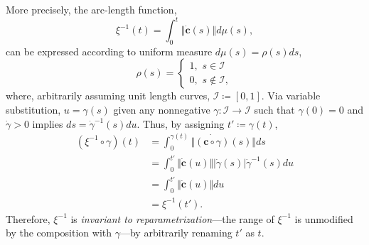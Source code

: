 \documentclass[pdflatex,iicol]{sn-jnl}%
\theoremstyle{thmstyleone}%
\theoremstyle{thmstyletwo}%
\theoremstyle{thmstylethree}%
\begin{document}
More precisely, the arc-length function,
\begin{equation}
    \xi^{-1}(t) = \int_{0}^t \Vert \dot{\boldsymbol{c}}(s) \Vert d\mu(s),
\end{equation}
can be expressed according to uniform measure $d\mu(s) = \rho(s)ds$, 
\begin{equation}
    \rho(s) = \begin{cases}
                    1, \,\, s \in \mathcal{I}\\
                    0, \,\, s \notin \mathcal{I},
              \end{cases}
\end{equation} 
where, arbitrarily assuming unit length curves, $\mathcal{I} \coloneqq [0,1]$. Via variable substitution, $u = \gamma(s)$ given any nonnegative $\gamma:\mathcal{I} \rightarrow\mathcal{I}$ such that $\gamma(0) = 0$ and $\dot{\gamma} > 0$ implies $ds = \dot{\gamma}^{-1}(s)du$. Thus, by assigning $t' \coloneqq \gamma(t)$,
\begin{align}
    (\xi^{-1}\circ \gamma)(t) &= \int_0^{\gamma(t)}\Vert \dot{(\boldsymbol{c}\circ \gamma)}(s)\Vert ds \\ \nonumber
    &= \int_0^{t'} \Vert \dot{\boldsymbol{c}}(u) \Vert \vert \dot{\gamma}(s) \vert \dot{\gamma}^{-1}(s)du \\ \nonumber
    &= \int_0^{t'}\Vert \dot{\boldsymbol{c}}(u) \Vert du\\ \nonumber
    &= \xi^{-1}(t')\nonumber.
\end{align}
Therefore, $\xi^{-1}$ is \textit{invariant to reparametrization}---the range of $\xi^{-1}$ is unmodified by the composition with $\gamma$---by arbitrarily renaming $t'$ as $t$. 
\end{document}
